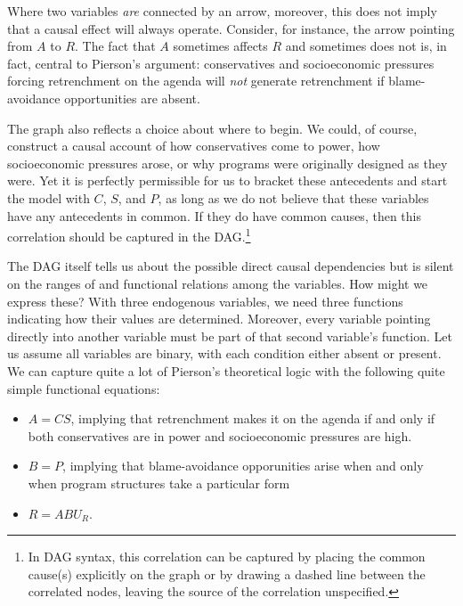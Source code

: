 \documentclass[12pt,]{book}
\providecommand{\tightlist}{%
  \setlength{\itemsep}{0pt}\setlength{\parskip}{0pt}}
\let\rmarkdownfootnote\footnote%
\def\footnote{\protect\rmarkdownfootnote}
\begin{document}
Where two variables \emph{are} connected by an arrow, moreover, this does not imply that a causal effect will always operate. Consider, for instance, the arrow pointing from \(A\) to \(R\). The fact that \(A\) sometimes affects \(R\) and sometimes does not is, in fact, central to Pierson's argument: conservatives and socioeconomic pressures forcing retrenchment on the agenda will \emph{not} generate retrenchment if blame-avoidance opportunities are absent.

The graph also reflects a choice about where to begin. We could, of course, construct a causal account of how conservatives come to power, how socioeconomic pressures arose, or why programs were originally designed as they were. Yet it is perfectly permissible for us to bracket these antecedents and start the model with \(C\), \(S\), and \(P\), as long as we do not believe that these variables have any antecedents in common. If they do have common causes, then this correlation should be captured in the DAG.\footnote{In DAG syntax, this correlation can be captured by placing the common cause(s) explicitly on the graph or by drawing a dashed line between the correlated nodes, leaving the source of the correlation unspecified.}

The DAG itself tells us about the possible direct causal dependencies but is silent on the ranges of and functional relations among the variables. How might we express these? With three endogenous variables, we need three functions indicating how their values are determined. Moreover, every variable pointing directly into another variable must be part of that second variable's function. Let us assume all variables are binary, with each condition either absent or present. We can capture quite a lot of Pierson's theoretical logic with the following quite simple functional equations:

\begin{itemize}
\tightlist
\item
  \(A=CS\), implying that retrenchment makes it on the agenda if and only if both conservatives are in power and socioeconomic pressures are high.
\item
  \(B=P\), implying that blame-avoidance opporunities arise when and only when program structures take a particular form
\item
  \(R=ABU_R\).
\end{itemize}
\end{document}
